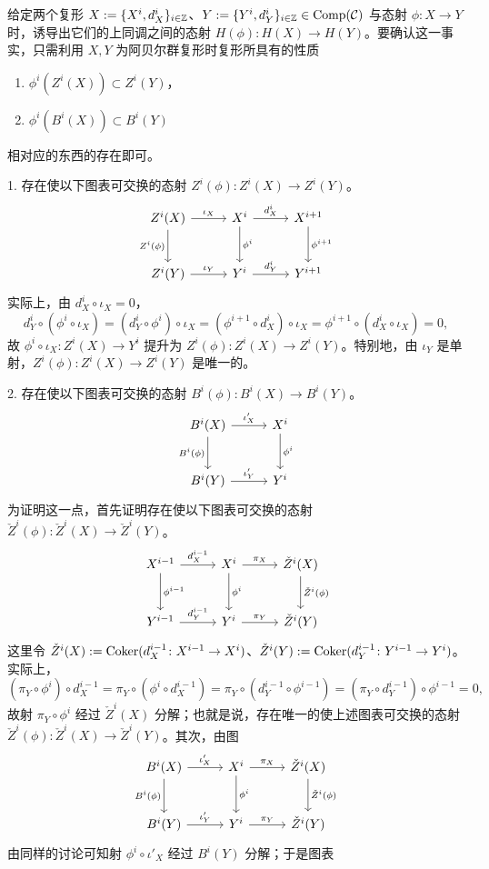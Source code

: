 给定两个复形 $X:=\{X^i,d_X^i\}_{i\in\mathbb{Z}}$、$Y:=\{Y^i,d_Y^i\}_{i\in\mathbb{Z}}\in\operatorname{Comp}(\mathcal{C})$ 与态射 $\phi\colon X\to Y$ 时，诱导出它们的上同调之间的态射 $H(\phi)\colon H(X)\to H(Y)$。要确认这一事实，只需利用 $X,Y$ 为阿贝尔群复形时复形所具有的性质

\begin{enumerate}
  \item $\phi^i(Z^i(X))\subset Z^i(Y)$，
  \item $\phi^i(B^i(X))\subset B^i(Y)$
\end{enumerate}
相对应的东西的存在即可。

1. 存在使以下图表可交换的态射 $Z^i(\phi)\colon Z^i(X)\to Z^i(Y)$。
\[\begin{tikzcd}[row sep=2.6em, column sep=2.8em]
  Z^i(X) \arrow[r,"\iota_X"] \arrow[d,"Z^i(\phi)"'] & X^i \arrow[r,"d_X^i"] \arrow[d,"\phi^i"] & X^{i+1} \arrow[d,"\phi^{i+1}"] \\
  Z^i(Y) \arrow[r,"\iota_Y"] & Y^i \arrow[r,"d_Y^i"] & Y^{i+1}
\end{tikzcd}\]
实际上，由 $d_X^i\circ\iota_X=0$，
\[ d_Y^i\circ(\phi^i\circ\iota_X)=(d_Y^i\circ\phi^i)\circ\iota_X=(\phi^{i+1}\circ d_X^i)\circ\iota_X=\phi^{i+1}\circ(d_X^i\circ\iota_X)=0, \]
故 $\phi^i\circ\iota_X\colon Z^i(X)\to Y^i$ 提升为 $Z^i(\phi)\colon Z^i(X)\to Z^i(Y)$。特别地，由 $\iota_Y$ 是单射，$Z^i(\phi)\colon Z^i(X)\to Z^i(Y)$ 是唯一的。

2. 存在使以下图表可交换的态射 $B^i(\phi)\colon B^i(X)\to B^i(Y)$。
\[\begin{tikzcd}[row sep=2.6em, column sep=2.8em]
  B^i(X) \arrow[r,"\iota'_X"] \arrow[d,"B^i(\phi)"'] & X^i \arrow[d,"\phi^i"] \\
  B^i(Y) \arrow[r,"\iota'_Y"] & Y^i
\end{tikzcd}\]
为证明这一点，首先证明存在使以下图表可交换的态射 $\check{Z}^i(\phi)\colon\check{Z}^i(X)\to\check{Z}^i(Y)$。
\[\begin{tikzcd}[row sep=2.6em, column sep=2.8em]
  X^{i-1} \arrow[r,"d_X^{i-1}"] \arrow[d,"\phi^{i-1}"] & X^i \arrow[r,"\pi_X"] \arrow[d,"\phi^i"] & \check{Z}^i(X) \arrow[d,"\check{Z}^i(\phi)"] \\
  Y^{i-1} \arrow[r,"d_Y^{i-1}"] & Y^i \arrow[r,"\pi_Y"] & \check{Z}^i(Y)
\end{tikzcd}\]
这里令 $\check{Z}^i(X):=\operatorname{Coker}(d_X^{i-1}\colon X^{i-1}\to X^i)$、$\check{Z}^i(Y):=\operatorname{Coker}(d_Y^{i-1}\colon Y^{i-1}\to Y^i)$。实际上，
\[ (\pi_Y\circ\phi^i)\circ d_X^{i-1}=\pi_Y\circ(\phi^i\circ d_X^{i-1})=\pi_Y\circ(d_Y^{i-1}\circ\phi^{i-1})=(\pi_Y\circ d_Y^{i-1})\circ\phi^{i-1}=0, \]
故射 $\pi_Y\circ\phi^i$ 经过 $\check{Z}^i(X)$ 分解；也就是说，存在唯一的使上述图表可交换的态射 $\check{Z}^i(\phi)\colon\check{Z}^i(X)\to\check{Z}^i(Y)$。其次，由图
\[\begin{tikzcd}[row sep=2.6em, column sep=2.8em]
  B^i(X) \arrow[r,"\iota'_X"] \arrow[d,"B^i(\phi)"'] & X^i \arrow[r,"\pi_X"] \arrow[d,"\phi^i"] & \check{Z}^i(X) \arrow[d,"\check{Z}^i(\phi)"] \\
  B^i(Y) \arrow[r,"\iota'_Y"] & Y^i \arrow[r,"\pi_Y"] & \check{Z}^i(Y)
\end{tikzcd}\]
由同样的讨论可知射 $\phi^i\circ\iota'_X$ 经过 $B^i(Y)$ 分解；于是图表

